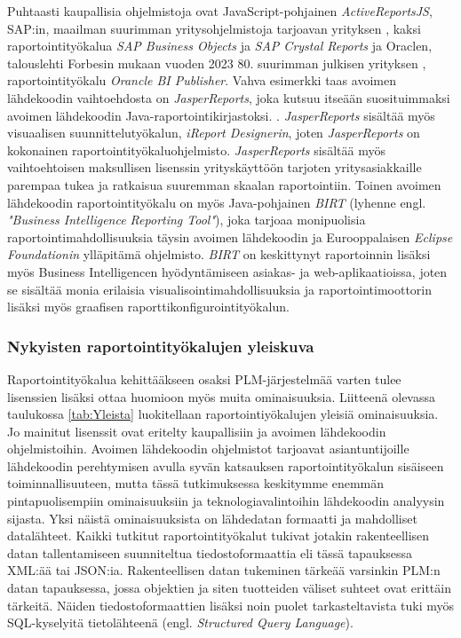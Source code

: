 Puhtaasti kaupallisia ohjelmistoja ovat JavaScript-pohjainen \textit{ActiveReportsJS}, SAP:in, maailman suurimman yritysohjelmistoja tarjoavan yrityksen \cite{noauthor_sap_nodate-3}, kaksi raportointityökalua \textit{SAP Business Objects} ja \textit{SAP Crystal Reports} ja Oraclen, talouslehti Forbesin mukaan vuoden 2023 80. suurimman julkisen yrityksen \cite{tucker_global_nodate}, raportointityökalu \textit{Orancle BI Publisher}. Vahva esimerkki taas avoimen lähdekoodin vaihtoehdosta on \textit{JasperReports}, joka kutsuu itseään suosituimmaksi avoimen lähdekoodin Java-raportointikirjastoksi. \cite{noauthor_jasperreports_nodate}. \textit{JasperReports} sisältää myös visuaalisen suunnittelutyökalun, \textit{iReport Designerin}, joten \textit{JasperReports} on kokonainen raportointityökaluohjelmisto. \textit{JasperReports} sisältää myös vaihtoehtoisen maksullisen lisenssin yrityskäyttöön tarjoten yritysasiakkaille parempaa tukea ja ratkaisua suuremman skaalan raportointiin. \cite{noauthor_reporting_nodate} Toinen avoimen lähdekoodin raportointityökalu on myös Java-pohjainen \textit{BIRT} (lyhenne engl. \textit{"Business Intelligence Reporting Tool"}), joka tarjoaa monipuolisia raportointimahdollisuuksia täysin avoimen lähdekoodin ja Eurooppalaisen \textit{Eclipse Foundationin} ylläpitämä ohjelmisto. \cite{eclipsebirtBIRT} \textit{BIRT} on keskittynyt raportoinnin lisäksi myös Business Intelligencen hyödyntämiseen asiakas- ja web-aplikaatioissa, joten se sisältää monia erilaisia visualisointimahdollisuuksia ja raportointimoottorin lisäksi myös graafisen raporttikonfigurointityökalun.

\subsubsection{Nykyisten raportointityökalujen yleiskuva}

Raportointityökalua kehittääkseen osaksi PLM-järjestelmää varten tulee lisenssien lisäksi ottaa huomioon myös muita ominaisuuksia. Liitteenä olevassa taulukossa \ref{tab:Yleista} luokitellaan raportointiyökalujen yleisiä ominaisuuksia. Jo mainitut lisenssit ovat eritelty kaupallisiin ja avoimen lähdekoodin ohjelmistoihin. Avoimen lähdekoodin ohjelmistot tarjoavat asiantuntijoille lähdekoodin perehtymisen avulla syvän katsauksen raportointityökalun sisäiseen toiminnallisuuteen, mutta tässä tutkimuksessa keskitymme enemmän pintapuolisempiin ominaisuuksiin ja teknologiavalintoihin lähdekoodin analyysin sijasta. Yksi näistä ominaisuuksista on lähdedatan formaatti ja mahdolliset datalähteet. Kaikki tutkitut raportointityökalut tukivat jotakin rakenteellisen datan tallentamiseen suunniteltua tiedostoformaattia eli tässä tapauksessa XML:ää tai JSON:ia. Rakenteellisen datan tukeminen tärkeää varsinkin PLM:n datan tapauksessa, jossa objektien ja siten tuotteiden väliset suhteet ovat erittäin tärkeitä. Näiden tiedostoformaattien lisäksi noin puolet tarkasteltavista tuki myös SQL-kyselyitä tietolähteenä  (engl. \textit{Structured Query Language}). 


